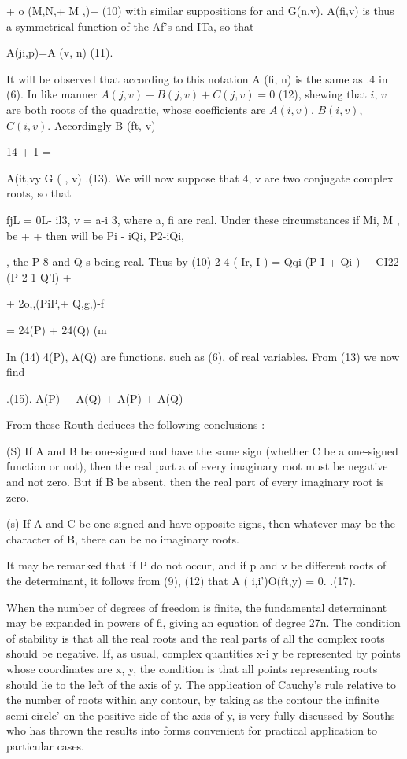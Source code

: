 + o (M,N,+ M ,)+ (10)
with similar suppositions for and G(n,v). A(fi,v) is
thus a symmetrical function of the Af’s and ITa, so that

A(ji,p)=A (v, n) (11).

It will be observed that according to this notation A (fi, n) is
the same as .4 in (6).
In like manner \(A(j,v) + B(j,v) + C(j,v)=0\) (12),
shewing that \(i\), \(v\) are both roots of the quadratic, whose coefficients
are \(A(i,v)\), \(B(i,v)\), \(C(i,v)\). Accordingly
B (ft, v)

14 + 1 =

A(it,vy
G ( , v)
.(13).
We will now suppose that 4, v are two conjugate complex
roots, so that

fjL = 0L- il3, v = a-i 3,
where a, fi are real. Under these circumstances if Mi, M , be
+ + then will be Pi - iQi, P2-iQi,

, the P 8 and Q s being real. Thus by (10) 2-4 ( Ir, I ) = Qqi (P I + Qi ) + CI22 (P 2 1 Q’l) +

+ 2o,,(PiP,+ Q,g,)-f

= 24(P) + 24(Q) (m

In (14) 4(P), A(Q) are functions, such as (6), of real variables.
From (13) we now find

.(15).
A(P) + A(Q)
+  A(P) + A(Q)

From these Routh deduces the following conclusions :

(S) If A and B be one-signed and have the same sign
(whether C be a one-signed function or not), then the real part a
of every imaginary root must be negative and not zero. But if B
be absent, then the real part of every imaginary root is zero.

(s) If A and C be one-signed and have opposite signs, then
whatever may be the character of B, there can be no imaginary
roots.

It may be remarked that if P do not occur, and if p and v
be different roots of the determinant, it follows from (9), (12) that
A ( i,i')O(ft,y) = 0.
.(17).

When the number of degrees of freedom is finite, the fundamental determinant
may be expanded in powers of fi, giving
an equation of degree 27n. The condition of stability
is that all the real roots and the real parts of all the complex
roots should be negative. If, as usual, complex quantities x-i y
be represented by points whose coordinates are x, y, the condition
is that all points representing roots should lie to the left of the
axis of y. The application of Cauchy’s rule relative to the
number of roots within any contour, by taking as the contour the
infinite semi-circle' on the positive side of the axis of y, is very
fully discussed by Souths who has thrown the results into forms
convenient for practical application to particular cases.

